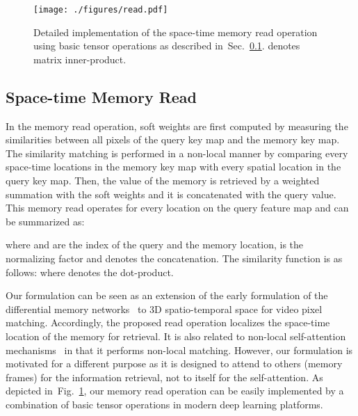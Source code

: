 \documentclass[10pt,twocolumn,letterpaper]{article}
\newcommand{\fref}[1]{Fig.~\ref{#1}}
\newcommand{\sref}[1]{Sec.~\ref{#1}}
\begin{document}
\begin{figure}
\centering
\texttt{[image: ./figures/read.pdf]}
\caption{Detailed implementation of the space-time memory read operation using basic tensor operations as described in~\sref{read}.  denotes matrix inner-product.}
\label{Fig:read}
\end{figure}


\subsection{Space-time Memory Read}\label{read}
In the memory read operation, soft weights are first computed by measuring the similarities between all pixels of the query key map and the memory key map. 
The similarity matching is performed in a non-local manner by comparing every space-time locations in the memory key map with every spatial location in the query key map.
Then, the value of the memory is retrieved by a weighted summation with the soft weights and it is concatenated with the query value. This memory read operates for every location on the query feature map and can be summarized as:  

where  and  are the index of the query and the memory location,  is the normalizing factor and  denotes the concatenation. 
The similarity function  is as follows:
where  denotes the dot-product.

Our formulation can be seen as an extension of the early formulation of the differential memory networks~\cite{sukhbaatar2015end, miller2016key, kumar2016ask} to 3D spatio-temporal space for video pixel matching.
Accordingly, the proposed read operation localizes the space-time location of the memory for retrieval.
It is also related to non-local self-attention mechanisms~\cite{vaswani2017attention, wang2018non} in that it performs non-local matching. 
However, our formulation is motivated for a different purpose as it is designed to attend to others (memory frames) for the information retrieval, not to itself for the self-attention.
As depicted in~\fref{Fig:read}, our memory read operation can be easily implemented by a combination of basic tensor operations in modern deep learning platforms. 
\end{document}
